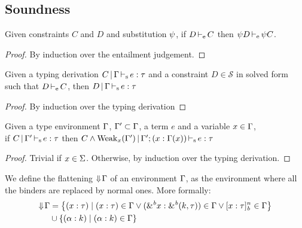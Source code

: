 \newcommand\mcase[1]{\noindent\textbf{Case }#1\\\noindent}

\subsection{Soundness}

\begin{lemma}
  \label{lemma:constrsubst}
  Given constraints $C$ and $D$ and substitution $\mathrm{\psi}$, if $D \operatorname{\vdash_e} C$
  then $\mathrm{\psi} D \operatorname{\vdash_e} \mathrm{\psi} C$.
  \begin{proof}
    By induction over the entailment judgement.
  \end{proof}
\end{lemma}

\begin{lemma}
  \label{lemma:constrimply}
  Given a typing derivation $C \operatorname{|} \Gamma \operatorname{\vdash_s} e : \tau$ and
  a constraint $D \in \mathcal S$ in solved form such that $D \operatorname{\vdash_e} C$, then
  $D \operatorname{|} \Gamma \operatorname{\vdash_s} e : \tau$
  \begin{proof}
    By induction over the typing derivation
  \end{proof}
\end{lemma}


\begin{lemma}
  \label{lemma:typ:weakening}
  Given a type environment $\Gamma$, $\Gamma' \subset \Gamma$, a term $e$ and a variable $x\in\Gamma$,\\
  if $C \operatorname{|} \Gamma' \operatorname{\vdash_s} e : \tau$
  then $C\wedge \operatorname{Weak}_{x}(\Gamma') \operatorname{|} \Gamma';(x : \Gamma(x)) \operatorname{\vdash_s} e : \tau$

  \begin{proof}
    Trivial if $x \in \Sigma$. Otherwise, by induction over the typing derivation.
  \end{proof}
\end{lemma}


We define the flattening $\Downarrow\!\Gamma$ of an environment $\Gamma$, as the environment
where all the binders are replaced by normal ones. More formally:
\begin{align*}
  \Downarrow\!\Gamma
  &= \left\{ (x : \tau) \mid
    (x : \tau)\in\Gamma
    \vee ({\&}^{\textit{b}}x : {\&}^{\textit{b}}(k,\tau))\in\Gamma
    \vee [x : \tau]_{\textit{b}}^n\in\Gamma
    \right\}\\
  &\cup \left\{ (\alpha : k) \mid (\alpha : k)\in\Gamma \right\}
\end{align*}

